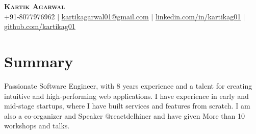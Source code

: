 \documentclass[letterpaper,11pt]{article}
\begin{document}

\begin{center}
    \textbf{\Huge \scshape Kartik Agarwal} \\ \vspace{1pt}
    \small +91-8077976962 $|$ \href{mailto:x@x.com}{\underline{kartikagarwal01@gmail.com}} $|$ 
    \href{https://linkedin.com/in/kartikag01}{\underline{linkedin.com/in/kartikag01}} $|$
    \href{https://github.com/kartikag01}{\underline{github.com/kartikag01}}
\end{center}


\section{Summary}

Passionate Software Engineer, with 8 years experience and a talent for creating intuitive and high-performing web applications. I have experience in early and mid-stage startups, where I have built services and features from scratch.
I am also a co-organizer and Speaker @reactdelhincr and have given More than 10 workshops and talks.

\end{document}
